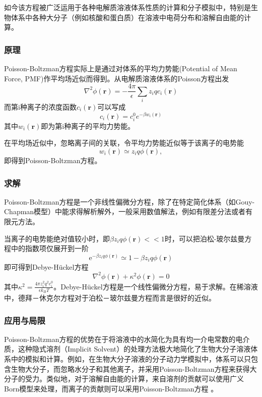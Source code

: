 \documentclass[twoside,twocolumn]{article}
\begin{document}
\begin{CJK*}{UTF8}{gkai}
如今该方程被广泛运用于各种电解质溶液体系性质的计算和分子模拟中，特别是生物体系中各种大分子（例如核酸和蛋白质）在溶液中电荷分布和溶解自由能的计算。
\subsubsection{原理}
Poisson-Boltzman方程实际上是通过对体系的平均力势能(Potential of Mean Force, PMF)作平均场近似而得到。从电解质溶液体系的Poisson方程出发
\begin{equation*}
\nabla ^{2}\phi ({\textbf {r}})=-{\frac {4\pi }{\epsilon }}\sum _{i}z_{i}qc_{i}({\textbf {r}})
\end{equation*}
而第i种离子的浓度函数$c_{i}({\textbf {r}})$可以写成
\begin{equation*}
c_{i}({\textbf {r}})=c_{i}^{0}e^{{-\beta w_{i}({\textbf {r}})}}
\end{equation*}
其中$w_{i}({\textbf {r}})$即为第i种离子的平均力势能。

在平均场近似中，忽略离子间的关联，令平均力势能近似等于该离子的电势能
\begin{equation*}
w_{i}({\textbf {r}})\simeq z_{i}q\phi ({\textbf {r}}),
\end{equation*}
即得到Poisson-Boltzman方程。
\subsubsection{求解}
Poisson-Boltzman方程是一个非线性偏微分方程，除了在特定简化体系（如Gouy-Chapman模型）中能求得解析解外，一般采用数值解法，例如有限差分法或者有限元方法。

当离子的电势能绝对值较小时，即$ \beta z_{i}q\phi ({\textbf {r}})<<1$时，可以把泊松-玻尔兹曼方程中的指数项仅展开到一阶
\begin{equation*}
\mathrm{e}^{{-\beta z_{i}q\phi ({\textbf {r}})}}\simeq 1-\beta z_{i}q\phi ({\textbf {r}})
\end{equation*}
即可得到Debye-Hückel方程
\begin{equation*}
\nabla ^{2}\phi ({\textbf {r}})+\kappa ^{2}\phi ({\textbf {r}})=0
\end{equation*}
其中$\kappa ^{2}={\frac {4\pi z_{i}^{2}q^{2}c_{i}^{{0}}}{\epsilon k_{B}T}}$。Debye-Hückel方程是一个线性偏微分方程，易于求解。在稀溶液中，德拜－休克尔方程对于泊松－玻尔兹曼方程而言是很好的近似。
\subsubsection{应用与局限}
Poisson-Boltzman方程的优势在于将溶液中的水简化为具有均一介电常数的电介质，这种隐式溶剂（Implicit Solvent）的处理方法极大地简化了生物大分子溶液体系中的模拟和计算。例如，在生物大分子溶液的分子动力学模拟中，体系可以只包含生物大分子，而忽略水分子和其他离子，并采用Poisson-Boltzman方程来获得大分子的受力。类似地，对于溶解自由能的计算，来自溶剂的贡献可以使用广义Born模型来处理，而离子的贡献则可以采用Poisson-Boltzman方程 。


\end{CJK*}
\end{document}
